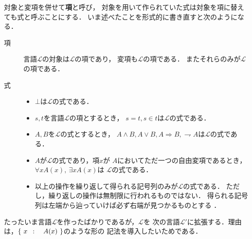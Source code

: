 	対象と変項を併せて{\bf 項}と呼び，
	対象を用いて作られていた式は対象を項に替えても式と呼ぶことにする．
	いま述べたことを形式的に書き直すと次のようになる．
	\begin{description}
		\item[項] 言語$\mathcal{L}$の対象は$\mathcal{L}$の項であり，
			変項も$\mathcal{L}$の項である．
			またそれらのみが$\mathcal{L}$の項である．
			
		\item[式] 
			\begin{itemize}
				\item $\bot$は$\mathcal{L}$の式である．
				
				\item $s,t$を言語$\mathcal{L}$の項とするとき，
					$s=t,s \in t$は$\mathcal{L}$の式である．
					
				\item $A,B$を$\mathcal{L}$の式とするとき，
					$A \wedge B,A \vee B,A\Longrightarrow B,
					\rightharpoondown A$は$\mathcal{L}$の式である．
				
				\item $A$が$\mathcal{L}$の式であり，項$x$が
					$A$においてただ一つの自由変項であるとき，
					$\forall x A(x),\ \exists x A(x)$は
					$\mathcal{L}$の式である．
				
				\item 以上の操作を繰り返して得られる記号列のみが$\mathcal{L}$の式である．
					ただし，繰り返しの操作は無制限に行われるものではない．
					得られる記号列は左端から辿っていけば必ず右端が見つかるものとする
					\footnotemark．
			\end{itemize}
	\end{description}
	
	たったいま言語$\mathcal{L}$を作ったばかりであるが，$\mathcal{L}$を
	次の言語$\mathcal{L}'$に拡張する．理由は，$\left\{\ x\ \, : \quad A(x)\ \right\}$のような形の
	記法を導入したいためである．
	
